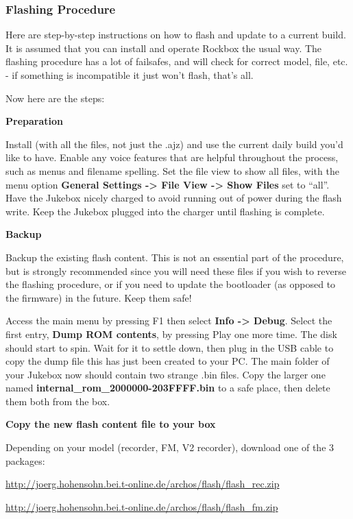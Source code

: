 \subsubsection{\label{ref:FlashingProcedure}Flashing Procedure}
Here are step{}-by{}-step instructions on how to flash and update to a
current build.  It is assumed that you can install and operate Rockbox
the usual way. The flashing procedure has a lot of failsafes, and will
check for correct model, file, etc. {}- if something is incompatible it
just won't flash, that's all. 

Now here are the steps: 

\textbf{Preparation}

Install (with all the files, not just the .ajz) and use the current
daily build you'd like to have. Enable any voice
features that are helpful throughout the process, such as menus and
filename spelling. Set the file view to show all files, with  the menu
option \textbf{General Settings {}-{\textgreater} File View
{}-{\textgreater} Show Files} set to ``all''.
Have the Jukebox nicely charged to avoid
running out of power during the flash write.  Keep the Jukebox plugged
into the charger until flashing is complete.

{\bfseries
Backup }

Backup the existing flash content.  This is not an essential part of the
procedure, but is strongly recommended since you will need these files
if you wish to reverse the flashing procedure, or if you need to update
the bootloader (as opposed to the firmware) in the future.  Keep them
safe!

Access the main menu by pressing F1 then select \textbf{Info
{}-{\textgreater} Debug}.  Select the first entry, \textbf{Dump ROM
contents}, by pressing Play one more time. The disk should start to
spin. Wait for it to settle down, then plug in the USB cable  to copy
the dump file this has just been created to your PC. The main folder of
your Jukebox now should contain two strange .bin files. Copy the larger
one named
\textbf{internal\_rom\_2000000{}-203FFFF.bin}
to a safe place, then delete them both from the box. 

{\bfseries
Copy the new flash content file to your box }

Depending on your model (recorder, FM, V2 recorder), download one of the
3 packages: 

\url{http://joerg.hohensohn.bei.t-online.de/archos/flash/flash_rec.zip}

\url{http://joerg.hohensohn.bei.t-online.de/archos/flash/flash_fm.zip}

